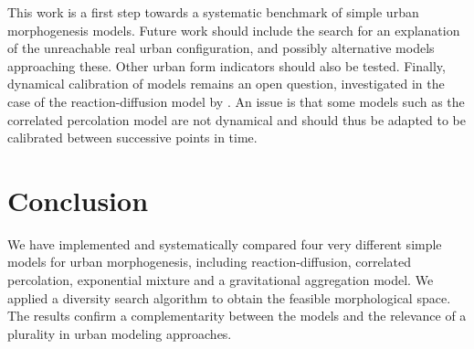 \documentclass[10pt,letterpaper]{article}
\begin{document}


This work is a first step towards a systematic benchmark of simple urban morphogenesis models. Future work should include the search for an explanation of the unreachable real urban configuration, and possibly alternative models approaching these. Other urban form indicators should also be tested. Finally, dynamical calibration of models remains an open question, investigated in the case of the reaction-diffusion model by \cite{raimbault:halshs-02406539}. An issue is that some models such as the correlated percolation model are not dynamical and should thus be adapted to be calibrated between successive points in time.

\section*{Conclusion}

We have implemented and systematically compared four very different simple models for urban morphogenesis, including reaction-diffusion, correlated percolation, exponential mixture and a gravitational aggregation model. We applied a diversity search algorithm to obtain the feasible morphological space. The results confirm a complementarity between the models and the relevance of a plurality in urban modeling approaches.








\nolinenumbers




%
%
% 
\end{document}
